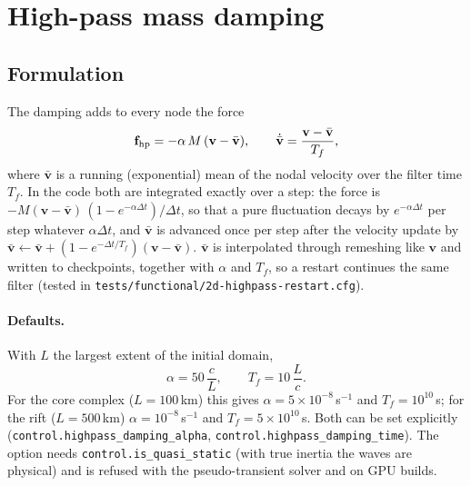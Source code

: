 \documentclass[11pt]{article}
\newcommand{\vbar}{\bar{\mathbf v}}
\newcommand{\code}[1]{\texttt{#1}}
\begin{document}
\section{High-pass mass damping}
\label{sec:hp}

\subsection{Formulation}
The damping adds to every node the force
\begin{equation}
  \mathbf f_{\rm hp} = -\alpha\,M\,(\mathbf v-\vbar),\qquad
  \dot{\vbar} = \frac{\mathbf v-\vbar}{T_f},
  \label{eq:hp}
\end{equation}
where $\vbar$ is a running (exponential) mean of the nodal velocity over the filter time $T_f$.
In the code both are integrated exactly over a step: the force is
$-M(\mathbf v-\vbar)\,(1-e^{-\alpha\Delta t})/\Delta t$, so that a pure fluctuation decays by
$e^{-\alpha\Delta t}$ per step whatever $\alpha\Delta t$, and $\vbar$ is advanced once per step
after the velocity update by $\vbar\leftarrow\vbar+(1-e^{-\Delta t/T_f})(\mathbf v-\vbar)$.
$\vbar$ is interpolated through remeshing like $\mathbf v$ and written to checkpoints, together
with $\alpha$ and $T_f$, so a restart continues the same filter (tested in
\code{tests/functional/2d-highpass-restart.cfg}).

\paragraph{Defaults.} With $L$ the largest extent of the initial domain,
\begin{equation}
  \alpha = 50\,\frac{c}{L},\qquad T_f = 10\,\frac{L}{c}.
\end{equation}
For the core complex ($L=100$\,km) this gives $\alpha=5\times10^{-8}$\,s$^{-1}$ and
$T_f=10^{10}$\,s; for the rift ($L=500$\,km) $\alpha=10^{-8}$\,s$^{-1}$ and $T_f=5\times10^{10}$\,s.
Both can be set explicitly (\code{control.highpass\_damping\_alpha},
\code{control.highpass\_damping\_time}). The option needs \code{control.is\_quasi\_static}
(with true inertia the waves are physical) and is refused with the pseudo-transient solver and on
GPU builds.
\end{document}
